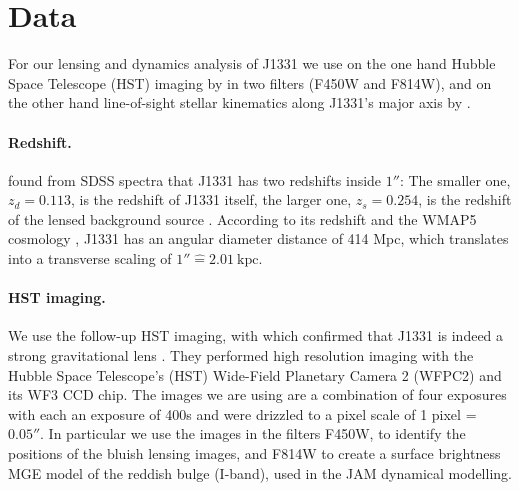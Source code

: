 \section{Data} \label{sec:data}

For our lensing and dynamics analysis of J1331 we use on the one hand Hubble Space Telescope (HST) imaging by \cite{SWELLSI} in two filters (F450W and F814W), and on the other hand line-of-sight stellar kinematics along J1331's major axis by \citet{SWELLSV}.

\paragraph{Redshift.} \Wilma{[TO DO: WHO???]} found from SDSS spectra that J1331 has two redshifts inside $1''$: The smaller one, $z_d = 0.113$, is the redshift of J1331 itself, the larger one, $z_s = 0.254$, is the redshift of the lensed background source \citep{SWELLSIII}. According to its redshift and the WMAP5  cosmology \citep{WMAP5cosm}, J1331 has an angular diameter distance of 414 Mpc, which translates into a transverse scaling of $1'' \hat{=} 2.01~\text{kpc}$.

\paragraph{HST imaging.} We use the follow-up HST imaging, with which \citet{SWELLSI} confirmed that J1331 is indeed a strong gravitational lens . They performed high resolution imaging with the Hubble Space Telescope's (HST) Wide-Field Planetary Camera 2 (WFPC2) and its WF3 CCD chip.  The images we are using are a combination of four exposures with each an exposure of 400s and were drizzled to a pixel scale of 1 pixel = $0.05''$. In particular we use the images in the filters F450W, to identify the positions of the bluish lensing images, and F814W to create a surface brightness MGE model of the reddish bulge (I-band), used in the JAM dynamical modelling.

